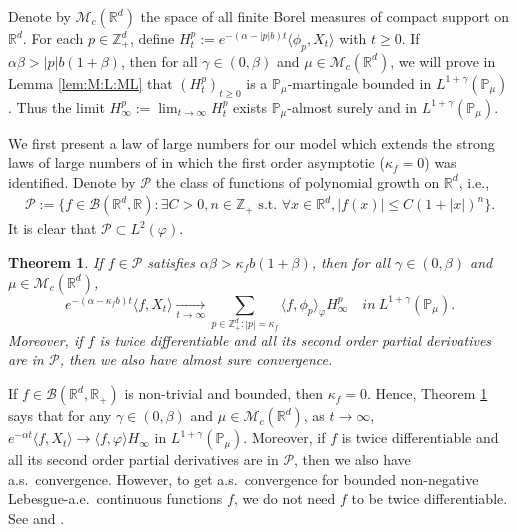 \documentclass[12pt,a4paper]{amsart}
\theoremstyle{plain}
\newtheorem{thm}{Theorem}[section]
\theoremstyle{definition}
\numberwithin{equation}{section}
\begin{document}
Denote by $\mathcal M_c(\mathbb R^d)$ the space of all finite Borel measures of compact support on $\mathbb R^d$.
For each $p\in \mathbb{Z}_+^d$, define
\(
  H_t^p
  := e^{-(\alpha-|p|b)t}\langle\phi_p,X_t\rangle
\)
with $t\geq 0$.
If $\alpha\beta>|p|b(1+\beta)$, then for all $\gamma\in (0, \beta)$ and $\mu\in \mathcal M_c(\mathbb R^d)$, we will prove in Lemma \ref{lem:M:L:ML} that $(H_t^p)_{t\geq 0}$ is a $\mathbb{P}_{\mu}$-martingale bounded in $L^{1+\gamma}(\mathbb{P}_{\mu})$.
Thus the limit $H^p_{\infty}:=\lim_{t\rightarrow \infty}H_t^p$ exists $\mathbb{P}_{\mu}$-almost surely and in $L^{1+\gamma}(\mathbb{P}_{\mu})$.

We first present a law of large numbers for our model which extends the strong laws of large numbers of \cite{ChenRenYang2019Skeleton, EckhoffKyprianouWinkel2015Spines} in which the first order asymptotic ($\kappa_f=0$) was identified.
Denote by $\mathcal P$ the class of functions of polynomial growth on $\mathbb R^d$, i.e.,
\begin{align}
  \label{eq: polynomial growth function}
  \mathcal{P}
  := \{f\in \mathcal B(\mathbb R^d, \mathbb R):\exists C>0, n \in \mathbb Z_+ \text{~s.t.~} \forall x\in \mathbb R^d, |f(x)|\leq C(1+|x|)^n \}.
\end{align}
It is clear that $\mathcal{P} \subset L^2(\varphi)$.
\begin{thm}
  \label{thm: law of large number}
  If $f \in \mathcal{P}$ satisfies $\alpha\beta>\kappa_fb(1+\beta)$, then for all $\gamma\in (0, \beta)$ and  $\mu\in \mathcal M_c(\mathbb R^d)$,
  \[
    e^{-(\alpha-\kappa_fb)t}\langle f, X_t\rangle
    \xrightarrow[t\to \infty]{}\sum_{p\in \mathbb Z_+^d:|p|=\kappa_f}\langle f, \phi_p\rangle_{\varphi} H_{\infty}^p
    \quad in~ L^{1+\gamma}(\mathbb{P}_{\mu}).
  \]
  Moreover, if $f$ is twice differentiable and all its second order partial derivatives are in $\mathcal{P}$, then we also have almost sure convergence.
\end{thm}
If $f\in \mathcal B(\mathbb R^d, \mathbb R_+)$ is non-trivial and  bounded, then $\kappa_f=0$.
Hence, Theorem \ref{thm: law of large number} says that for any $\gamma\in (0, \beta)$ and  $\mu\in \mathcal M_c(\mathbb R^d)$, as $t\rightarrow \infty$,
\(
  e^{-\alpha t}\langle f, X_t\rangle
  \rightarrow \langle f, \varphi\rangle H_{\infty}
\)
in $L^{1+\gamma}(\mathbb{P}_{\mu})$.
Moreover, if $f$ is twice differentiable and all its second order partial derivatives are in $\mathcal{P}$, then we also have a.s.\ convergence.
However, to get a.s.\ convergence for bounded non-negative
Lebesgue-a.e.\ continuous functions $f$, we do not need $f$ to be twice differentiable. 
See \cite[Theorem 2.13 \& Example 8.1]{ChenRenYang2019Skeleton} and \cite[Theorem 1.2 \& Example 4.1]{EckhoffKyprianouWinkel2015Spines}.
\end{document}
